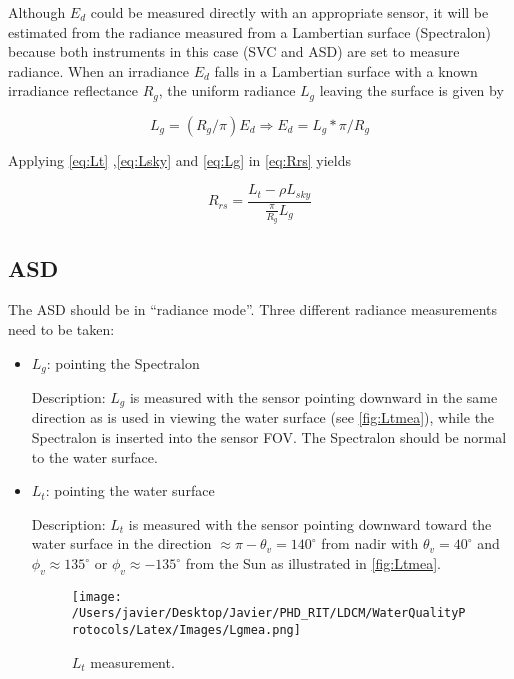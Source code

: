 \begin{appendices}
Although $E_d$ could be measured directly with an appropriate sensor, it will be estimated from the radiance measured from a Lambertian surface (Spectralon) because both instruments in this case (SVC and ASD) are set to measure radiance. When an irradiance $E_d$ falls in a Lambertian surface with a known irradiance reflectance $R_g$, the uniform radiance $L_g$ leaving the surface is given by 

\begin{equation}\label{eq:Lg}
	L_g = (R_g/\pi)E_d\Rightarrow E_d = L_g*\pi/R_g
\end{equation}

Applying \autoref{eq:Lt} ,\autoref{eq:Lsky} and \autoref{eq:Lg} in \autoref{eq:Rrs} yields

\begin{equation}
	R_{rs} = \frac{L_t-\rho L_{sky}}{\frac{\displaystyle \pi}{\displaystyle R_g}L_g}
\end{equation}

\subsection{ASD}

The ASD should be in ``radiance mode''. Three different radiance measurements need to be taken:
\begin{itemize}
	\item $L_g$: pointing the Spectralon

Description: $L_g$ is measured with the sensor pointing downward in the same direction as is used in viewing the water surface (see \autoref{fig:Ltmea}), while the Spectralon is inserted into the sensor FOV. The Spectralon should be normal to the water surface.

	\item $L_t$: pointing the water surface

Description: $L_t$ is measured with the sensor pointing downward toward the water surface in the direction $\approx \pi-\theta_v = 140^\circ$ from nadir with $\theta_v = 40^\circ$ and $\phi_v \approx 135^\circ$ or $\phi_v \approx -135^\circ$ from the Sun as illustrated in \autoref{fig:Ltmea}.

\begin{figure}[h]
\centering
    \texttt{[image: /Users/javier/Desktop/Javier/PHD\_RIT/LDCM/WaterQualityProtocols/Latex/Images/Lgmea.png]}
    \vspace{0.5cm}
   \caption[]{\label{fig:Ltmea} $L_t$ measurement.}
\end{figure}


\end{itemize}
\end{appendices}
